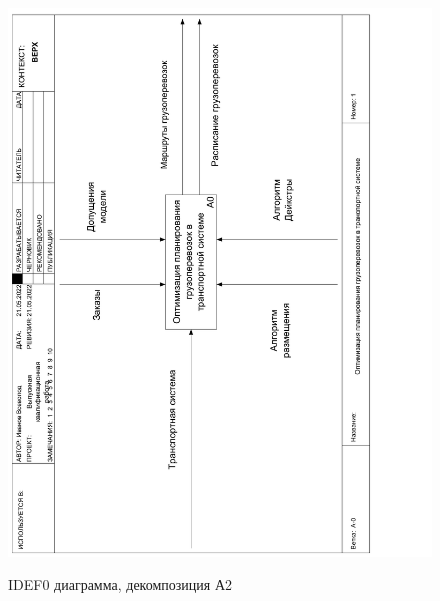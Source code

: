 \begin{figure}[h]
	\begin{center}
		{\includegraphics[scale=0.5, angle=-90, page=4]{img/idef0.pdf}}
		\caption{IDEF0 диаграмма, декомпозиция А2}
		\label{idef0:A2}
	\end{center}
\end{figure}

